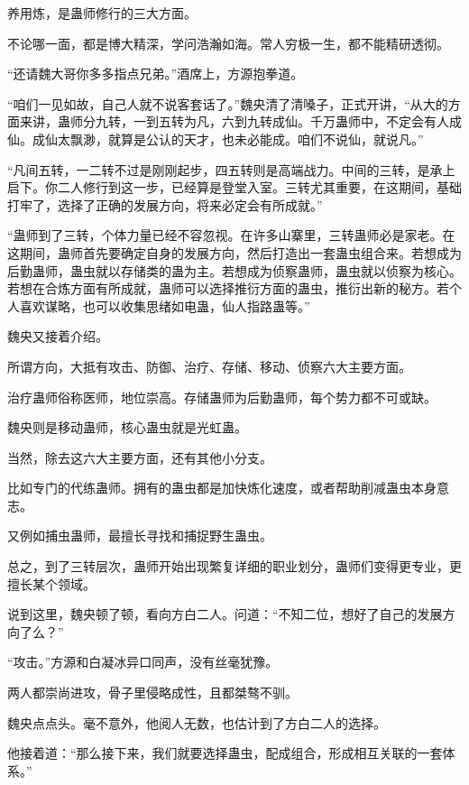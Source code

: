 
\begin{this_body}

养用炼，是蛊师修行的三大方面。

不论哪一面，都是博大精深，学问浩瀚如海。常人穷极一生，都不能精研透彻。

“还请魏大哥你多多指点兄弟。”酒席上，方源抱拳道。

“咱们一见如故，自己人就不说客套话了。”魏央清了清嗓子，正式开讲，“从大的方面来讲，蛊师分九转，一到五转为凡，六到九转成仙。千万蛊师中，不定会有人成仙。成仙太飘渺，就算是公认的天才，也未必能成。咱们不说仙，就说凡。”

“凡间五转，一二转不过是刚刚起步，四五转则是高端战力。中间的三转，是承上启下。你二人修行到这一步，已经算是登堂入室。三转尤其重要，在这期间，基础打牢了，选择了正确的发展方向，将来必定会有所成就。”

“蛊师到了三转，个体力量已经不容忽视。在许多山寨里，三转蛊师必是家老。在这期间，蛊师首先要确定自身的发展方向，然后打造出一套蛊虫组合来。若想成为后勤蛊师，蛊虫就以存储类的蛊为主。若想成为侦察蛊师，蛊虫就以侦察为核心。若想在合炼方面有所成就，蛊师可以选择推衍方面的蛊虫，推衍出新的秘方。若个人喜欢谋略，也可以收集思绪如电蛊，仙人指路蛊等。”

魏央又接着介绍。

所谓方向，大抵有攻击、防御、治疗、存储、移动、侦察六大主要方面。

治疗蛊师俗称医师，地位崇高。存储蛊师为后勤蛊师，每个势力都不可或缺。

魏央则是移动蛊师，核心蛊虫就是光虹蛊。

当然，除去这六大主要方面，还有其他小分支。

比如专门的代练蛊师。拥有的蛊虫都是加快炼化速度，或者帮助削减蛊虫本身意志。

又例如捕虫蛊师，最擅长寻找和捕捉野生蛊虫。

总之，到了三转层次，蛊师开始出现繁复详细的职业划分，蛊师们变得更专业，更擅长某个领域。

说到这里，魏央顿了顿，看向方白二人。问道：“不知二位，想好了自己的发展方向了么？”

“攻击。”方源和白凝冰异口同声，没有丝毫犹豫。

两人都崇尚进攻，骨子里侵略成性，且都桀骜不驯。

魏央点点头。毫不意外，他阅人无数，也估计到了方白二人的选择。

他接着道：“那么接下来，我们就要选择蛊虫，配成组合，形成相互关联的一套体系。”


\end{this_body}
